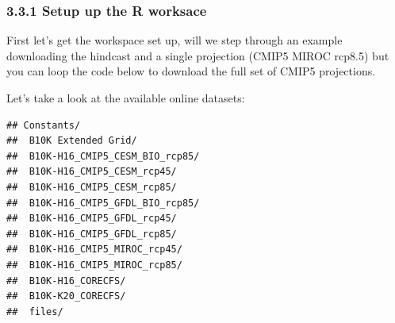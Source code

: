 \documentclass[
]{article}
\newenvironment{Shaded}{\begin{snugshade}}{\end{snugshade}}
\newcommand{\CharTok}[1]{\textcolor[rgb]{0.31,0.60,0.02}{#1}}
\newcommand{\CommentTok}[1]{\textcolor[rgb]{0.56,0.35,0.01}{\textit{#1}}}
\newcommand{\DataTypeTok}[1]{\textcolor[rgb]{0.13,0.29,0.53}{#1}}
\newcommand{\KeywordTok}[1]{\textcolor[rgb]{0.13,0.29,0.53}{\textbf{#1}}}
\newcommand{\NormalTok}[1]{#1}
\newcommand{\OperatorTok}[1]{\textcolor[rgb]{0.81,0.36,0.00}{\textbf{#1}}}
\newcommand{\StringTok}[1]{\textcolor[rgb]{0.31,0.60,0.02}{#1}}
\begin{document}
\hypertarget{setup-up-the-r-worksace}{%
\subsubsection{3.3.1 Setup up the R
worksace}\label{setup-up-the-r-worksace}}

First let's get the workspace set up, will we step through an example
downloading the hindcast and a single projection (CMIP5 MIROC rcp8.5)
but you can loop the code below to download the full set of CMIP5
projections.

\begin{Shaded}
\end{Shaded}

Let's take a look at the available online datasets:

\begin{Shaded}
\end{Shaded}

\begin{verbatim}
## Constants/ 
##  B10K Extended Grid/ 
##  B10K-H16_CMIP5_CESM_BIO_rcp85/ 
##  B10K-H16_CMIP5_CESM_rcp45/ 
##  B10K-H16_CMIP5_CESM_rcp85/ 
##  B10K-H16_CMIP5_GFDL_BIO_rcp85/ 
##  B10K-H16_CMIP5_GFDL_rcp45/ 
##  B10K-H16_CMIP5_GFDL_rcp85/ 
##  B10K-H16_CMIP5_MIROC_rcp45/ 
##  B10K-H16_CMIP5_MIROC_rcp85/ 
##  B10K-H16_CORECFS/ 
##  B10K-K20_CORECFS/ 
##  files/
\end{verbatim}
\end{document}
